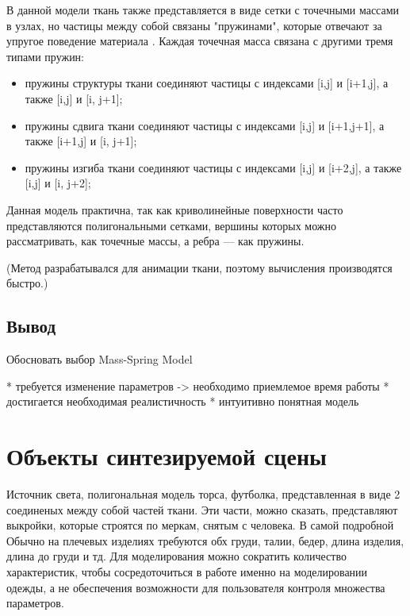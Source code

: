 \begin{itemize}[left=\parindent]
        В данной модели ткань также представляется в виде сетки с точечными массами в узлах, но частицы между собой связаны "пружинами", которые отвечают за упругое поведение материала \cite{bib15}. Каждая точечная масса связана с другими тремя типами пружин:
        \begin{itemize}[left=\parindent]
            \item пружины структуры ткани соединяют частицы с индексами [i,j] и [i+1,j], а также [i,j] и [i, j+1];
            \item пружины сдвига ткани соединяют частицы с индексами [i,j] и [i+1,j+1], а также [i+1,j] и [i, j+1];
            \item пружины изгиба ткани соединяют частицы с индексами [i,j] и [i+2,j], а также [i,j] и [i, j+2];
        \end{itemize}
        Данная модель практична, так как криволинейные поверхности часто представляются полигональными сетками, вершины которых можно рассматривать, как точечные массы, а ребра --- как пружины.


        (Метод разрабатывался для анимации ткани, поэтому вычисления производятся
        быстро.)

\end{itemize}

\subsection*{Вывод}

Обосновать выбор Mass-Spring Model

* требуется изменение параметров -> необходимо приемлемое время работы
* достигается необходимая реалистичность
* интуитивно понятная модель

\section{Объекты синтезируемой сцены}

Источник света, полигональная модель торса, футболка, представленная в виде
2 соединеных между собой частей ткани. Эти части, можно сказать, представляют
выкройки, которые строятся по меркам, снятым с человека. В самой подробной Обычно на плечевых
изделиях требуются обх груди, талии, бедер, длина изделия, длина до груди и тд.
Для моделирования можно сократить количество характеристик, чтобы
сосредоточиться в работе именно на моделировании одежды, а не обеспечения
возможности для пользователя контроля множества параметров.

